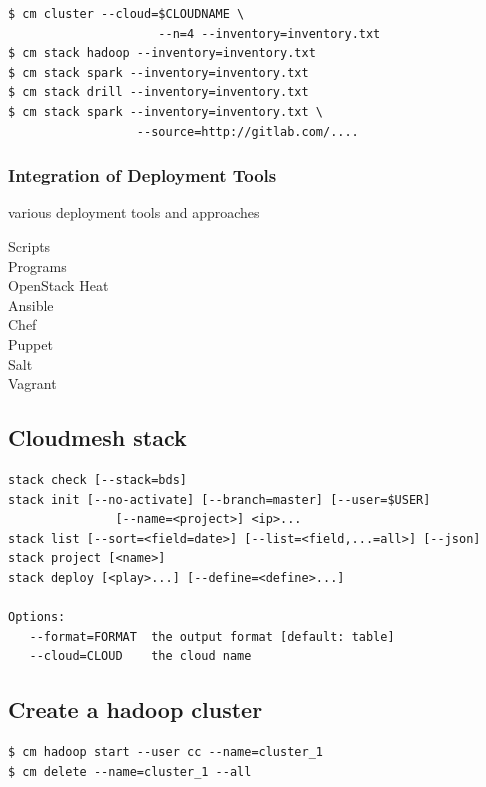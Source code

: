 \begin{Verbatim}[fontfamily=helvetica]
$ cm cluster --cloud=$CLOUDNAME \
                     --n=4 --inventory=inventory.txt
$ cm stack hadoop --inventory=inventory.txt
$ cm stack spark --inventory=inventory.txt
$ cm stack drill --inventory=inventory.txt
$ cm stack spark --inventory=inventory.txt \
                  --source=http://gitlab.com/....
\end{Verbatim}


\subsubsection{Integration of Deployment Tools}

various deployment tools and approaches

\begin{description}
\item[Scripts]
\item[Programs]
\item[OpenStack Heat]
\item[Ansible]
\item[Chef]
\item[Puppet]
\item[Salt]
\item[Vagrant]
\end{description}

\subsection{Cloudmesh stack}

\begin{Verbatim}[fontfamily=helvetica]
stack check [--stack=bds]
stack init [--no-activate] [--branch=master] [--user=$USER] 
               [--name=<project>] <ip>...
stack list [--sort=<field=date>] [--list=<field,...=all>] [--json]
stack project [<name>]
stack deploy [<play>...] [--define=<define>...]

Options:
   --format=FORMAT  the output format [default: table]
   --cloud=CLOUD    the cloud name
\end{Verbatim}

\subsection{Create a hadoop cluster}

\begin{Verbatim}[fontfamily=helvetica]
$ cm hadoop start --user cc --name=cluster_1
$ cm delete --name=cluster_1 --all  
\end{Verbatim}


